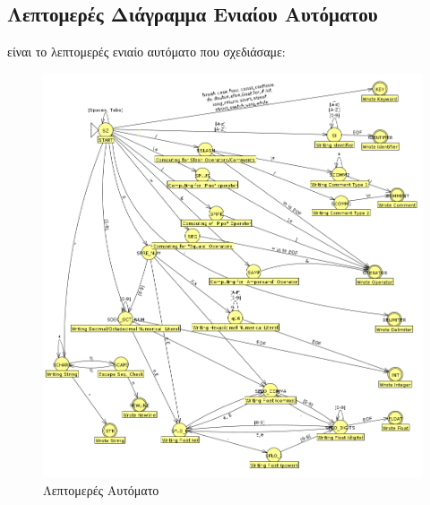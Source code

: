 \documentclass[14pt]{extarticle}
\begin{document}
\subsection{Λεπτομερές Διάγραμμα Ενιαίου Αυτόματου}
 είναι το λεπτομερές ενιαίο αυτόματο που σχεδιάσαμε:
\begin{figure}[h!]
  \caption{Λεπτομερές Αυτόματο}
  \includegraphics[width=1\textwidth]{automata_detailed}
\end{figure}

\clearpage
\end{document}
